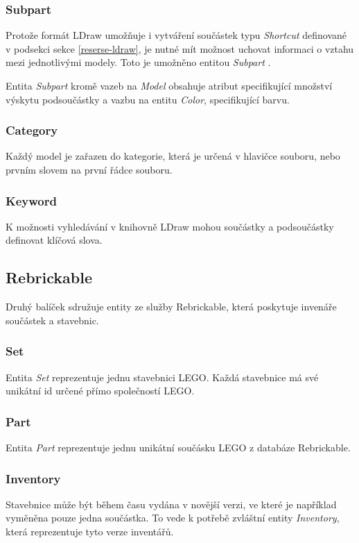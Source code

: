 \subsubsection*{Subpart}
Protože formát LDraw umožňuje i vytváření součástek typu \textit{Shortcut} definované v podsekci  sekce \ref{reserse-ldraw}, je nutné mít možnost uchovat informaci o vztahu mezi jednotlivými modely. Toto je umožněno entitou \textit{Subpart} . 

Entita \textit{Subpart} kromě vazeb na \textit{Model} obsahuje atribut specifikující množství výskytu podsoučástky a vazbu na entitu \textit{Color}, specifikující barvu. 

\subsubsection*{Category}
Každý model je zařazen do kategorie, která je určená v hlavičce souboru, nebo prvním slovem na první řádce souboru. 

\subsubsection*{Keyword}
K možnosti vyhledávání v knihovně LDraw mohou součástky a podsoučástky definovat klíčová slova.

\subsection{Rebrickable}
Druhý balíček sdružuje entity ze služby Rebrickable, která poskytuje invenáře součástek a stavebnic.

\subsubsection*{Set}
Entita \textit{Set} reprezentuje jednu stavebnici LEGO. Každá stavebnice má své unikátní id určené přímo společností LEGO. 

\subsubsection*{Part}
Entita \textit{Part} reprezentuje jednu unikátní součásku LEGO z databáze Rebrickable.

\subsubsection*{Inventory}
Stavebnice může být během času vydána v novější verzi, ve které je například vyměněna pouze jedna součástka. To vede k potřebě zvláštní entity \textit{Inventory}, která reprezentuje tyto verze inventářů. 

